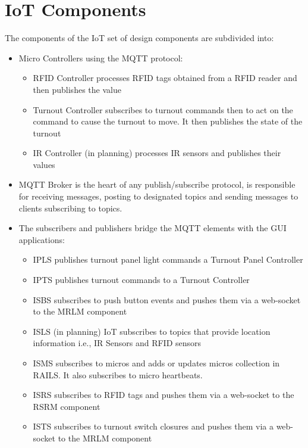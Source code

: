 \section{\ac{IoT} Components}
The components of the \ac{IoT} set of design components are subdivided into:
\begin{itemize}
  \item Micro Controllers using the \ac{MQTT} protocol:
\begin{itemize}
  \item \ac{RFID} Controller processes \ac{RFID} tags obtained from a \ac{RFID} reader and then publishes the value
  \item Turnout Controller subscribes to turnout commands then to act on the command to cause the turnout to move. It then publishes the state of the turnout
  \item \ac{IR} Controller (in planning) processes \ac{IR} sensors and publishes their values
\end{itemize}
  \item \ac{MQTT} Broker is the heart of any publish/subscribe protocol, is responsible for receiving messages, posting to designated topics and sending messages to clients subscribing to topics.
  \item The subscribers and publishers bridge the \ac{MQTT} elements with the \ac{GUI} applications:
\begin{itemize}
  \item \ac{IPLS} publishes turnout panel light commands a Turnout Panel Controller
  \item \ac{IPTS} publishes turnout commands to a Turnout Controller
  \item \ac{ISBS}  subscribes to push button events and pushes them via a web-socket to the MRLM component
  \item \ac{ISLS} (in planning) \ac{IoT} subscribes to topics that provide location information i.e., \ac{IR} Sensors and \ac{RFID} sensors
  \item \ac{ISMS} subscribes to micros and adds or updates micros collection in RAILS. It also subscribes to micro heartbeats.
  \item \ac{ISRS} subscribes to \ac{RFID} tags and pushes them via a web-socket to the \ac{RSRM} component
  \item \ac{ISTS} subscribes to turnout switch closures and pushes them via a web-socket to the \ac{MRLM} component
\end{itemize}
\end{itemize}

